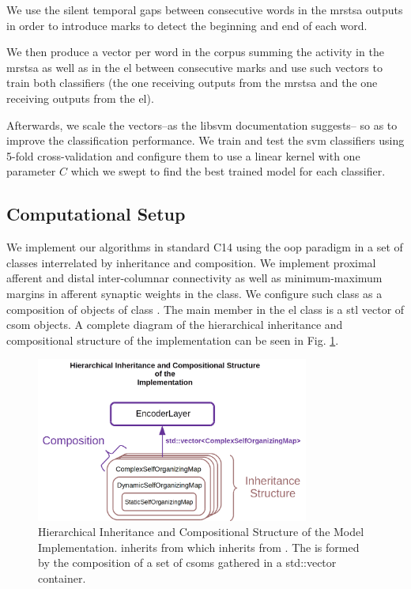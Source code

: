 \documentclass[10pt,letterpaper]{article}
\newcommand{\CC}{C\nolinebreak\hspace{-.05em}\raisebox{.4ex}{\tiny\bf +}\nolinebreak\hspace{-.10em}\raisebox{.4ex}{\tiny\bf +}}
\begin{document}
We use the silent temporal gaps between consecutive words in the \gls{mrstsa} outputs in order to introduce marks to
detect the beginning and end of each word.

We then produce a vector per word in the corpus summing the activity in the \gls{mrstsa} as well as in the \gls{el} between consecutive marks
and use such vectors to train both classifiers (the one receiving outputs from the \gls{mrstsa} and the one receiving outputs from the \gls{el}).

Afterwards, we scale the vectors--as the \gls{libsvm} documentation suggests--
so as to improve the classification performance.
We train and test the \gls{svm} classifiers using 5-fold cross-validation
and configure them to use a linear kernel with one parameter $C$ which
we swept to find the best trained model for each classifier.












\subsection*{Computational Setup}
\label{Comp_setup}

We implement our algorithms in standard
\CC14 using the \gls{oop} paradigm in a set of classes interrelated by inheritance and composition.
We implement proximal afferent and distal inter-columnar connectivity  
as well as minimum-maximum margins in afferent synaptic weights in the  class.
We configure such class as a composition of objects of class .
The main member in the \gls{el} class is a \gls{stl} vector of \gls{csom} objects.
A complete diagram of the hierarchical inheritance and compositional structure of the implementation
can be seen in Fig. \ref{fig:Skeleton}.

\begin{figure}[h!]
    \centering
    \includegraphics[width=0.8\textwidth]{Skeleton.png}
    \caption{Hierarchical Inheritance and Compositional Structure of the Model Implementation.
     inherits from  which inherits from .
    The  is formed by the composition of a set of \glspl{csom} gathered
    in a std::vector  container.}
    \label{fig:Skeleton}
\end{figure}
\end{document}
